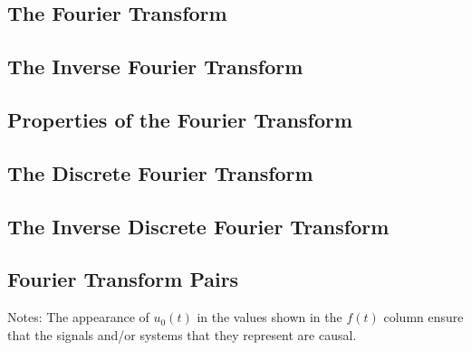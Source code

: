 \subsection*{The Fourier Transform}

\subsection*{The Inverse Fourier Transform}

\subsection*{Properties of the Fourier Transform}

\subsection*{The Discrete Fourier Transform}

\subsection*{The Inverse Discrete Fourier Transform}

\subsection*{Fourier Transform Pairs}
Notes: The appearance of $u_0(t)$ in the values shown in the $f(t)$ column ensure that 
the signals and/or systems that they represent are causal.
    
\endinput
